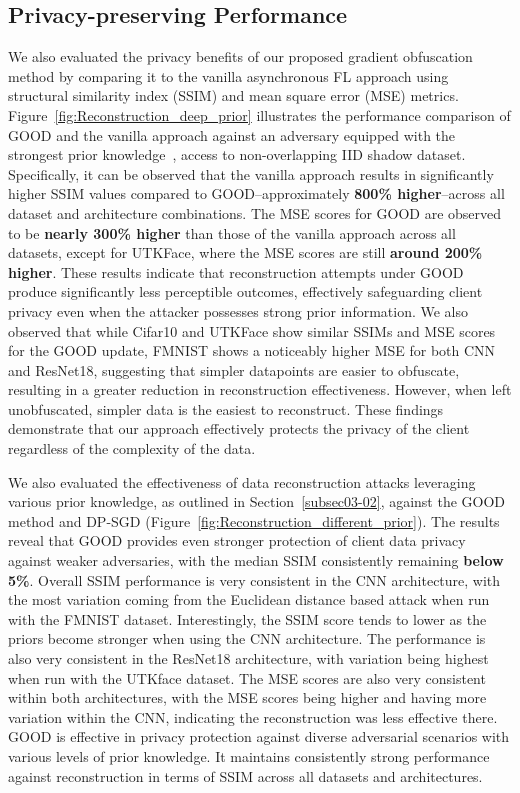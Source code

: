 \subsection{Privacy-preserving Performance}
We also evaluated the privacy benefits of our proposed gradient obfuscation method by comparing it to the vanilla asynchronous FL approach using structural similarity index (SSIM) and mean square error (MSE) metrics. Figure~\ref{fig:Reconstruction_deep_prior} illustrates the performance comparison of GOOD and the vanilla approach against an adversary equipped with the strongest prior knowledge~\cite{gradientObfuscation}, \ie access to non-overlapping IID shadow dataset. Specifically, it can be observed that the vanilla approach results in significantly higher SSIM values compared to GOOD--approximately \textbf{800\% higher}--across all dataset and architecture combinations. The MSE scores for GOOD are observed to be \textbf{nearly 300\% higher} than those of the vanilla approach across all datasets, except for UTKFace, where the MSE scores are still \textbf{around 200\% higher}. These results indicate that reconstruction attempts under GOOD produce significantly less perceptible outcomes, effectively safeguarding client privacy even when the attacker possesses strong prior information.
We also observed that while Cifar10 and UTKFace show similar SSIMs and MSE scores for the GOOD update, FMNIST shows a noticeably higher MSE for both CNN and ResNet18, suggesting that simpler datapoints are easier to obfuscate, resulting in a greater reduction in reconstruction effectiveness. However, when left unobfuscated, simpler data is the easiest to reconstruct. These findings demonstrate that our approach effectively protects the privacy of the client regardless of the complexity of the data. 





We also evaluated the effectiveness of data reconstruction attacks leveraging various prior knowledge, as outlined in Section~\ref{subsec03-02}, against the GOOD method and DP-SGD (Figure~\ref{fig:Reconstruction_different_prior}). The results reveal that GOOD provides even stronger protection of client data privacy against weaker adversaries, with the median SSIM consistently remaining \textbf{below 5\%}. 
Overall SSIM performance is very consistent in the CNN architecture, with the most variation coming from the Euclidean distance based attack when run with the FMNIST dataset. Interestingly, the SSIM score tends to lower as the priors become stronger when using the CNN architecture. The performance is also very consistent in the ResNet18 architecture, with variation being highest when run with the UTKface dataset. The MSE scores are also very consistent within both architectures, with the MSE scores being higher and having more variation within the CNN, indicating the reconstruction was less effective there. %
GOOD is effective in privacy protection against diverse adversarial scenarios with various levels of prior knowledge. It maintains consistently strong performance against reconstruction in terms of SSIM across all datasets and architectures. 
 
